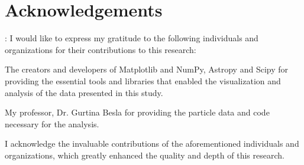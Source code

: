 \documentclass[preprint2, times]{aastex631}
\begin{document}
\section{Acknowledgements}:
I would like to express my gratitude to the following individuals and organizations for their contributions to this research:

The creators and developers of Matplotlib and NumPy, Astropy and Scipy for providing the essential tools and libraries that enabled the visualization and analysis of the data presented in this study.

My professor, Dr. Gurtina Besla for providing the particle data and code necessary for the analysis.

I acknowledge the invaluable contributions of the aforementioned individuals and organizations, which greatly enhanced the quality and depth of this research.
{}




\end{document}
